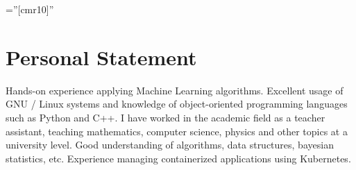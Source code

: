 \documentclass[a4paper,10pt]{article} %
\begin{document}
\pagestyle{empty} %
\BgThispage
\font\fb=''[cmr10]'' %

\small





\par{\bigskip\par} %
\par{\bigskip\par}
\par{\bigskip\par}


\bigskip
\section{Personal Statement}
\bigskip
Hands-on experience applying Machine Learning algorithms. Excellent usage of GNU / Linux systems and knowledge of object-oriented programming languages such as Python and C++. I have worked in the academic field as a teacher assistant, teaching mathematics, computer science, physics and other topics at a university level. Good understanding of algorithms, data structures, bayesian statistics, etc. Experience managing containerized applications using Kubernetes.
\end{document}
